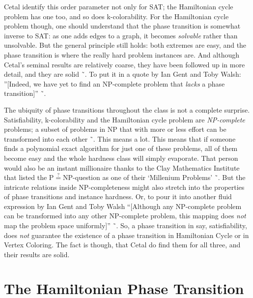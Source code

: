 \documentclass[10pt,conference,compsocconf]{IEEEtran}
\begin{document}
Cetal identify this order parameter not only for SAT; the Hamiltonian cycle problem has one too, and so does k-colorability. For the Hamiltonian cycle problem though, one should understand that the phase transition is somewhat inverse to SAT: as one adds edges to a graph, it becomes \textit{solvable} rather than unsolvable. But the general principle still holds: both extremes are easy, and the phase transition is where the really hard problem instances are. And although Cetal's seminal results are relatively coarse, they have been followed up in more detail, and they are solid ˜\cite{kirkpatrick1994critical,gent1994easy,hogg1994hardest,hogg1996refining}. To put it in a quote by Ian Gent and Toby Walsh: ''[Indeed, we have yet to find an NP-complete problem that \textit{lacks} a phase transition]'' ˜\cite{gent1996tsp}.


The ubiquity of phase transitions throughout the class is not a complete surprise. Satisfiability, k-colorability and the Hamiltonian cycle problem are \textit{NP-complete} problems; a subset of problems in NP that with more or less effort can be transformed into each other ˜\cite{garey2002computers}. This means a lot. This means that if someone finds a polynomial exact algorithm for just one of these problems, all of them become easy and the whole hardness class will simply evaporate. That person would also be an instant millionaire thanks to the Clay Mathematics Institute that listed the P$\stackrel{?}{=}$NP-question as one of their `Millenium Problems' ˜\cite{jaffe2006millennium}. But the intricate relations inside NP-completeness might also stretch into the properties of phase transitions and instance hardness. Or, to pour it into another fluid expression by Ian Gent and Toby Walsh ``[Although any NP-complete problem can be transformed into any other NP-complete problem, this mapping does \textit{not} map the problem space uniformly]'' ˜\cite{gent1996tsp}. So, a phase transition in say, satisfiability, does \textit{not} guarantee the existence of a phase transition in Hamiltonian Cycle or in Vertex Coloring. The fact is though, that Cetal do find them for all three, and their results are solid.


\section{The Hamiltonian Phase Transition}
\end{document}
